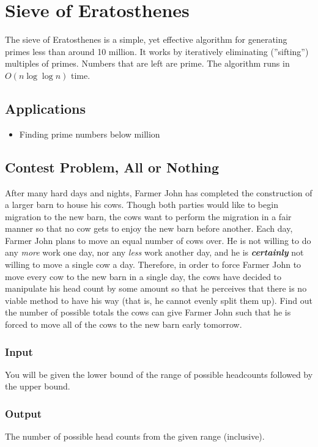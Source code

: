 \section{Sieve of Eratosthenes}
The sieve of Eratosthenes is a simple, yet effective algorithm for generating primes less than around 10 million.
It works by iteratively eliminating (''sifting'') multiples of primes.
Numbers that are left are prime.
The algorithm runs in $O(n\log\log n)$ time.

\subsection{Applications}
\begin{itemize}
	\item	Finding prime numbers below  million
\end{itemize}

\subsection{Contest Problem, All or Nothing}
After many hard days and nights, Farmer John has completed the construction of a larger barn to house his cows.
Though both parties would like to begin migration to the new barn, the cows want to perform the migration in a fair manner so that no cow gets to enjoy the new barn before another.
Each day, Farmer John plans to move an equal number of cows over.
He is not willing to do any \textit{more} work one day, nor any \textit{less} work another day, and he is \textbf{\textit{certainly}} not willing to move a single cow a day.
Therefore, in order to force Farmer John to move every cow to the new barn in a single day, the cows have decided to manipulate his head count by some amount so that he perceives that there is no viable method to have his way (that is, he cannot evenly split them up).
Find out the number of possible totals the cows can give Farmer John such that he is forced to move all of the cows to the new barn early tomorrow.

\subsubsection{Input}
You will be given the lower bound of the range of possible headcounts followed by the upper bound.


\subsubsection{Output}
The number of possible head counts from the given range (inclusive).


